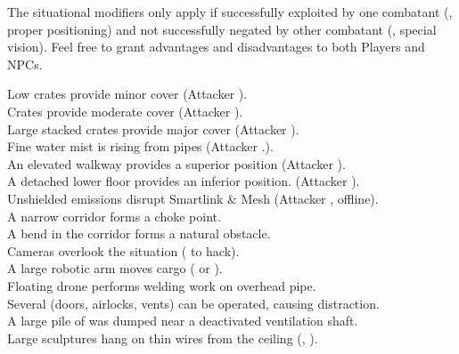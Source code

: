 \documentclass[a4]{article}
\begin{document}
The situational modifiers only apply if successfully exploited by
one combatant (\eg, proper positioning) and not successfully negated
by other combatant (\eg, special vision).
%
Feel free to grant advantages and disadvantages to both Players and NPCs.

\starttableone
Low crates provide minor cover (Attacker ).\\
Crates provide moderate cover (Attacker ).\\
Large stacked crates provide major cover (Attacker ).\\
Fine water mist is rising from pipes (Attacker .).\\
An elevated walkway provides a superior position (Attacker ).\\
A detached lower floor provides an inferior position. (Attacker ).\\
Unshielded emissions disrupt Smartlink \& Mesh (Attacker , offline).\\
A narrow corridor forms a choke point.\\
A bend in the corridor forms a natural obstacle.\\

Cameras overlook the situation ( to hack).\\
A large robotic arm moves cargo ( or ).\\
Floating drone performs welding work on overhead pipe.\\
Several (doors, airlocks, vents) can be operated, causing distraction.\\
A large pile of  was dumped near a deactivated ventilation shaft.\\

Large sculptures hang on thin wires from the ceiling (, ).\\

\stoptableone
\end{document}
